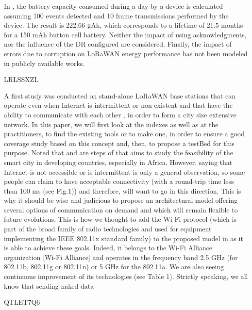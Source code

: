 In \cite{conus_event-driven_2016},
	the battery capacity consumed during a day by a device is calculated assuming 100 events detected and 10 frame transmissions performed by the device.
The result is 222.66 μAh,
	which corresponds to a lifetime of 21.5 months for a 150 mAh button cell battery.
Neither the impact of using acknowledgments,
	nor the influence of the DR configured are considered.
Finally,
	the impact of errors due to corruption on LoRaWAN energy performance has not been modeled in publicly available works.

\cite{barro_lorawan_nodate} LRLSSXZL


A first study \cite{barro_tltn_2019} was conducted on stand-alone LoRaWAN base stations that can operate even when Internet is intermittent or non-existent and that have the ability to communicate with each other \cite{barro_smart_2019},
	in order to form a city size extensive network.
In this paper,
	we will first look at the indexes as well as at the practitioners,
	to find the existing tools or to make one,
	in order to ensure a good coverage study based on this concept and,
	then,
	to propose a testBed for this purpose.
Noted that \cite{barro_tltn_2019} and \cite{barro_smart_2019} are steps of \cite{barro_towards_2018} that aims to study the feasibility of the smart city in developing countries,
	especially in Africa.
However,
	saying that Internet is not accessible or is intermittent is only a general observation,
	so some people can claim to have acceptable connectivity \cite{barro_smart_2019} (with a round-trip time less than 100 ms (see Fig.1)) and therefore,
	will want to go in this direction.
This is why it should be wise and judicious to propose an architectural model offering several options of communication on demand and which will remain flexible to future evolutions.
This is how we thought to add the Wi-Fi protocol (which is part of the broad family of radio technologies and used for equipment implementing the IEEE 802.11x standard family) to the proposed model in \cite{barro_smart_2019} as it is able to achieve these goals.
Indeed,
	it belongs to the Wi-Fi Alliance organization [Wi-Fi Alliance] and operates in the frequency band 2.5 GHz (for 802.11b, 802.11g or 802.11n) or 5 GHz for the 802.11a.
We are also seeing continuous improvement of its technologies (see Table 1).
Strictly speaking,
	we all know that sending naked data

\cite{blaszczyszyn_analyzing_2019} QTLET7Q6

